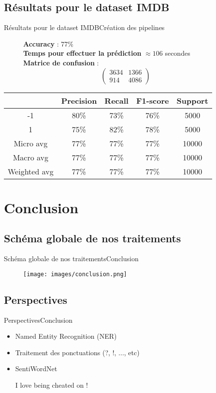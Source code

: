 \documentclass[usenames,dvipsnames]{beamer}
\begin{document}
\subsection{Résultats pour le dataset IMDB}
\begin{frame}{Résultats pour le dataset IMDB}{Création des pipelines}
\begin{figure}[!ht]
  \centering
  \textbf{Accuracy} : 77\% \\
  \textbf{Temps pour effectuer la prédiction} $\approx106$ secondes \\
  \textbf{Matrice de confusion} :
  $$
  \begin{pmatrix}
  3634 & 1366 \\
  914 & 4086
  \end{pmatrix}
  $$
\end{figure}

\begin{table}
  \centering
  \begin{tabular}{|c||c|c|c|c|}
    \hline
     & \textbf{Precision} & \textbf{Recall} & \textbf{F1-score} & \textbf{Support}\\
    \hline
    \hline
    -1 & 80\% & 73\% & 76\% & 5000\\
    \hline
    1 & 75\% & 82\% & 78\% & 5000\\
    \hline
    Micro avg & 77\% & 77\% & 77\% & 10000\\
    \hline
    Macro avg & 77\% & 77\% & 77\% & 10000\\
    \hline
    Weighted avg & 77\% & 77\% & 77\% & 10000\\
    \hline
  \end{tabular}
\end{table}
\end{frame}

\section{Conclusion}
\subsection{Schéma globale de nos traitements}
\begin{frame}{Schéma globale de nos traitements}{Conclusion}
\begin{figure}
    \centering
    \texttt{[image: images/conclusion.png]}
\end{figure}
\end{frame}

\subsection{Perspectives}
\begin{frame}{Perspectives}{Conclusion}
\begin{itemize}
    \item Named Entity Recognition (NER)
    \item Traitement des ponctuations (?, !, ..., etc)
    \item SentiWordNet
    \begin{example}
        I love being cheated on !
    \end{example}
\end{itemize}
\end{frame}
\end{document}
